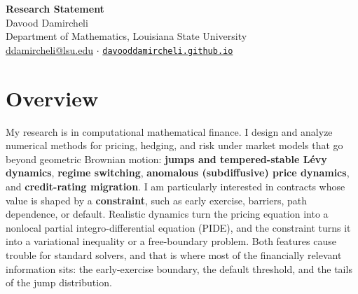 \documentclass[11pt]{article}
\begin{document}
\begin{center}
{\LARGE\bfseries Research Statement}\\[3pt]
{\large Davood Damircheli}\\[1pt]
{\small Department of Mathematics, Louisiana State University\\
\href{mailto:ddamircheli@lsu.edu}{ddamircheli@lsu.edu} \;$\cdot$\;
\href{https://davooddamircheli.github.io}{\nolinkurl{davooddamircheli.github.io}}}
\end{center}
\vspace{-4pt}

\section*{Overview}

My research is in computational mathematical finance. I design and analyze
numerical methods for pricing, hedging, and risk under market models that
go beyond geometric Brownian motion: \textbf{jumps and tempered-stable
L\'evy dynamics}, \textbf{regime switching}, \textbf{anomalous
(subdiffusive) price dynamics}, and \textbf{credit-rating migration}. I am
particularly interested in contracts whose value is shaped by a
\textbf{constraint}, such as early exercise, barriers, path dependence, or
default. Realistic dynamics turn the pricing equation into a nonlocal
partial integro-differential equation (PIDE), and the constraint turns it
into a variational inequality or a free-boundary problem. Both features
cause trouble for standard solvers, and that is where most of the
financially relevant information sits: the early-exercise boundary, the
default threshold, and the tails of the jump distribution.
\end{document}
